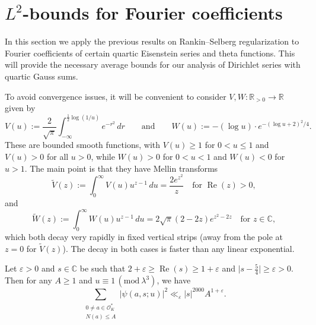 \documentclass[12pt,reqno]{amsart}
\numberwithin{equation}{section}
\renewcommand{\Re}{\operatorname{Re}}
\renewcommand{\pmod}[1]{\, (\mathrm{mod}\ #1)}
\newcommand{\R}{\mathbb{R}}
\newcommand{\C}{\mathbb{C}}
\begin{document}

\section{\texorpdfstring{$L^2$}{}-bounds for Fourier coefficients}

In this section we apply the previous results on Rankin--Selberg regularization to Fourier coefficients of certain quartic Eisenstein series and theta functions. This will provide the necessary average bounds for our analysis of Dirichlet series with quartic Gauss sums.

To avoid convergence issues, it will be convenient to consider $V, W : \R_{>0} \to \R$ given by
\begin{equation}\label{eq:V_W_defs}
    V(u) :=\frac{2}{\sqrt{\pi}}\int_{-\infty}^{\frac12\log(1/u)}e^{-r^2}\,dr \qquad \text{and} \qquad W(u) := - (\log{u}) \cdot e^{-(\log{u}+2)^2/4}.
\end{equation}
These are bounded smooth functions, with $V(u) \geq 1$ for $0<u\leq1$ and $V(u)>0$ for all $u>0$,
while $W(u) > 0$ for $0 < u < 1$ and $W(u) < 0$ for $u > 1$. The main point is that they have Mellin transforms
\begin{equation} \label{Vtilde}
    \widetilde{V}(z) := \int_0^\infty
     V(u) u^{z - 1} \, du = \frac{2e^{z^2}}{z} \quad \text{for }\Re(z)>0,
\end{equation}     
and 
\begin{equation} \label{Wtilde}     
\widetilde{W}(z) := \int_0^\infty W(u) u^{z - 1} \, du =2 \sqrt{\pi} (2-2z) e^{z^2-2z} \quad \text{for } z \in \mathbb{C},
\end{equation}
which both decay very rapidly in fixed vertical strips (away from the pole at $z=0$ for $\widetilde{V}(z)$).
The decay in both cases is faster than any linear exponential.

\begin{prop} \label{prop:psi_second_moment}
    Let $\varepsilon>0$ and $s\in \C$ be such that $2 + \varepsilon \geq \Re(s) \geq 1+\varepsilon$ and $\big|s - \frac{5}{4}\big| \geq \varepsilon > 0$. Then for any $A \geq 1$ and $u \equiv 1 \pmod{\lambda^3}$, we have
    \begin{equation*}
        \sum_{\substack{0 \neq a \in \mathcal{O}^*_K \\ N(a) \leq A}} |\psi(a, s; u)|^2 \ll_{\varepsilon} |{s}|^{2000}  A^{1+\varepsilon}.
    \end{equation*}
\end{prop}
\end{document}
